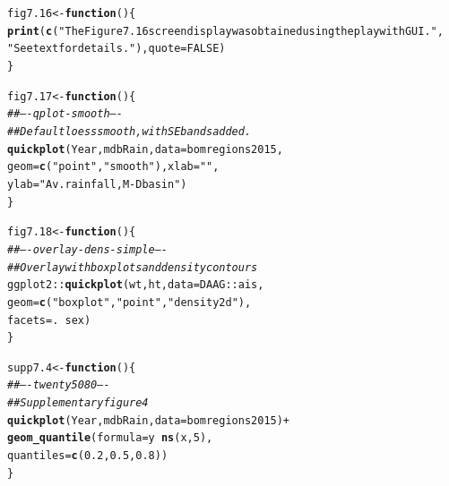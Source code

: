 \documentclass[12pt, a4paper,  BCOR=8.25mm, DIV=15]{scrartcl}\usepackage[]{graphicx}\usepackage[]{color}
\makeatletter
\newcommand{\hlnum}[1]{\textcolor[rgb]{0.686,0.059,0.569}{#1}}%
\newcommand{\hlstr}[1]{\textcolor[rgb]{0.192,0.494,0.8}{#1}}%
\newcommand{\hlcom}[1]{\textcolor[rgb]{0.678,0.584,0.686}{\textit{#1}}}%
\newcommand{\hlopt}[1]{\textcolor[rgb]{0,0,0}{#1}}%
\newcommand{\hlstd}[1]{\textcolor[rgb]{0.345,0.345,0.345}{#1}}%
\newcommand{\hlkwa}[1]{\textcolor[rgb]{0.161,0.373,0.58}{\textbf{#1}}}%
\newcommand{\hlkwb}[1]{\textcolor[rgb]{0.69,0.353,0.396}{#1}}%
\newcommand{\hlkwc}[1]{\textcolor[rgb]{0.333,0.667,0.333}{#1}}%
\newcommand{\hlkwd}[1]{\textcolor[rgb]{0.737,0.353,0.396}{\textbf{#1}}}%
\newenvironment{kframe}{%
 \def\at@end@of@kframe{}%
 \ifinner\ifhmode%
  \def\at@end@of@kframe{\end{minipage}}%
  \begin{minipage}{\columnwidth}%
 \fi\fi%
 \def\FrameCommand##1{\hskip\@totalleftmargin \hskip-\fboxsep
 \colorbox{shadecolor}{##1}\hskip-\fboxsep
     \hskip-\linewidth \hskip-\@totalleftmargin \hskip\columnwidth}%
 \MakeFramed {\advance\hsize-\width
   \@totalleftmargin\z@ \linewidth\hsize
   \@setminipage}}%
 {\par\unskip\endMakeFramed%
 \at@end@of@kframe}
\newenvironment{knitrout}{}{} %
\makeatother
\begin{document}
\begin{knitrout}
\color{fgcolor}\begin{kframe}
\begin{alltt}
\hlstd{fig7.16} \hlkwb{<-} \hlkwa{function}\hlstd{()\{}
\hlkwd{print}\hlstd{(}\hlkwd{c}\hlstd{(}\hlstr{"The Figure 7.16 screen display was obtained using the playwith GUI."}\hlstd{,}
        \hlstr{"See text for details."}\hlstd{),} \hlkwc{quote}\hlstd{=}\hlnum{FALSE}\hlstd{)}
\hlstd{\}}
\end{alltt}
\end{kframe}
\end{knitrout}

\begin{knitrout}
\color{fgcolor}\begin{kframe}
\begin{alltt}
\hlstd{fig7.17} \hlkwb{<-} \hlkwa{function}\hlstd{()\{}
\hlcom{## ---- qplot-smooth ----}
\hlcom{## Default loess smooth, with SE bands added.}
\hlkwd{quickplot}\hlstd{(Year, mdbRain,} \hlkwc{data}\hlstd{=bomregions2015,}
          \hlkwc{geom}\hlstd{=}\hlkwd{c}\hlstd{(}\hlstr{"point"}\hlstd{,}\hlstr{"smooth"}\hlstd{),} \hlkwc{xlab}\hlstd{=}\hlstr{""}\hlstd{,}
          \hlkwc{ylab}\hlstd{=}\hlstr{"Av. rainfall , M-D basin"}\hlstd{)}
\hlstd{\}}
\end{alltt}
\end{kframe}
\end{knitrout}

\begin{knitrout}
\color{fgcolor}\begin{kframe}
\begin{alltt}
\hlstd{fig7.18} \hlkwb{<-} \hlkwa{function}\hlstd{()\{}
\hlcom{## ---- overlay-dens-simple ----}
\hlcom{## Overlay with boxplots and density contours}
\hlstd{ggplot2}\hlopt{::}\hlkwd{quickplot}\hlstd{(wt, ht,} \hlkwc{data}\hlstd{=DAAG}\hlopt{::}\hlstd{ais,}
          \hlkwc{geom}\hlstd{=}\hlkwd{c}\hlstd{(}\hlstr{"boxplot"}\hlstd{,} \hlstr{"point"}\hlstd{,} \hlstr{"density2d"}\hlstd{),}
          \hlkwc{facets} \hlstd{= .} \hlopt{~} \hlstd{sex)}
\hlstd{\}}
\end{alltt}
\end{kframe}
\end{knitrout}

\begin{knitrout}
\color{fgcolor}\begin{kframe}
\begin{alltt}
\hlstd{supp7.4} \hlkwb{<-} \hlkwa{function}\hlstd{()\{}
\hlcom{## ---- twenty5080 ----}
\hlcom{## Supplementary figure 4}
\hlkwd{quickplot}\hlstd{(Year, mdbRain,} \hlkwc{data}\hlstd{=bomregions2015)} \hlopt{+}
  \hlkwd{geom_quantile}\hlstd{(}\hlkwc{formula} \hlstd{= y} \hlopt{~} \hlkwd{ns}\hlstd{(x,}\hlnum{5}\hlstd{),}
                \hlkwc{quantiles}\hlstd{=}\hlkwd{c}\hlstd{(}\hlnum{0.2}\hlstd{,}\hlnum{0.5}\hlstd{,}\hlnum{0.8}\hlstd{) )}
\hlstd{\}}
\end{alltt}
\end{kframe}
\end{knitrout}
\end{document}
